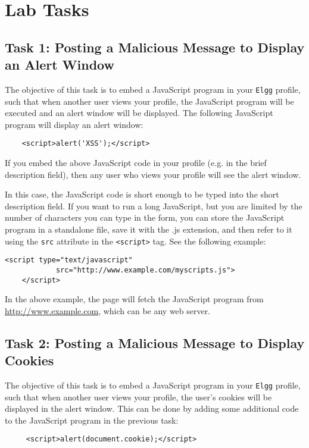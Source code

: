 \section{Lab Tasks}

\subsection{Task 1: Posting a Malicious Message to Display an Alert Window}

The objective of this task is to embed a JavaScript program in your 
{\tt Elgg} profile, such that when another user views your profile, 
the JavaScript program will be executed and an alert window
will be displayed. The following JavaScript program will display an alert window: 
\begin{Verbatim}
    <script>alert('XSS');</script> 
\end{Verbatim}
If you embed the above JavaScript code in your profile (e.g. in the brief
description field), then any user who views your profile will see the alert window. 

In this case, the JavaScript code is short enough to be typed into the 
short description field. If you want to run a long JavaScript, but you are limited
by the number of characters you can type in the form, you can store the 
JavaScript program in a standalone file, save it with the .js extension, and 
then refer to it using the {\tt src} attribute in the {\tt <script>} tag. 
See the following example:
\begin{Verbatim}[frame=single]
    <script type="text/javascript" 
            src="http://www.example.com/myscripts.js">
    </script>
\end{Verbatim}
In the above example, the page will fetch the JavaScript program from
\url{http://www.example.com}, which can be any web server.


\subsection{Task 2: Posting a Malicious Message to Display Cookies}

The objective of this task is to embed a JavaScript program in your 
{\tt Elgg} profile, such that when another user views your profile,
the user's cookies will be displayed in the alert window.
This can be done by adding some additional code to
the JavaScript program in the previous task:

\begin{Verbatim}
     <script>alert(document.cookie);</script> 
\end{Verbatim}


